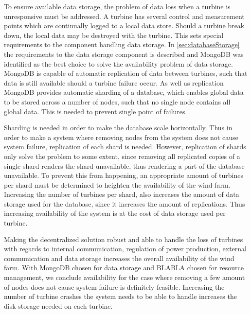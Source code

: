 To ensure available data storage, the problem of data loss when a turbine is unresponsive must be addressed. A turbine has several control and measurement points which are continually logged to a local data store. Should a turbine break down, the local data may be destroyed with the turbine. This sets special requirements to the component handling data storage. In \cref{sec:databaseStorage} the requirements to the data storage component is described and MongoDB was identified as the best choice to solve the availability problem of data storage. MongoDB is capable of automatic replication of data between turbines, such that data is still available should a turbine failure occur. As well as replication MongoDB provides automatic sharding of a database, which enables global data to be stored across a number of nodes, such that no single node contains all global data. This is needed to prevent single point of failures. 

Sharding is needed in order to make the database scale horizontally. Thus in order to make a system where removing nodes from the system does not cause system failure, replication of each shard is needed. However, replication of shards only solve the problem to some extent, since removing all replicated copies of a single shard renders the shard unavailable, thus rendering a part of the database unavailable. To prevent this from happening, an appropriate amount of turbines per shard must be determined to heighten the availability of the wind farm. Increasing the number of turbines per shard, also increases the amount of data storage used for the database, since it increases the amount of replications. Thus increasing availability of the system is at the cost of data storage used per turbine.

Making the decentralized solution robust and able to handle the loss of turbines with regards to internal communication, regulation of power production, external communication and data storage increases the overall availability of the wind farm. With MongoDB chosen for data storage and BLABLA chosen for resource management, we conclude availability for the case where removing a few amount of nodes does not cause system failure is definitely feasible. Increasing the number of turbine crashes the system needs to be able to handle increases the disk storage needed on each turbine.

\clearpage
